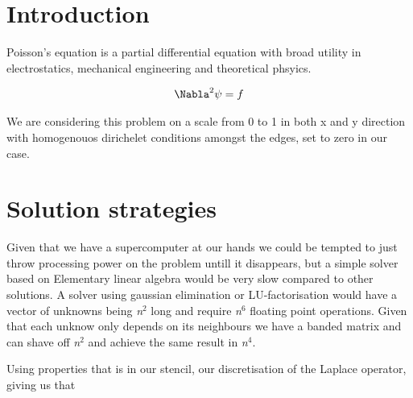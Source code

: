\section{Introduction}
Poisson's equation is a partial differential equation with broad utility in
electrostatics, mechanical engineering and theoretical phsyics.\cite{wiki}

\begin{align}
	\Nabla^2 \psi &= f \\
\end{align}

We are considering this problem on a scale from 0 to 1 in both x and y
direction with homogenouos dirichelet conditions amongst the edges, set to zero
in our case. 

\section{Solution strategies}
Given that we have a supercomputer at our hands we could be tempted to just
throw processing power on the problem untill it disappears, but a simple solver
based on Elementary linear algebra would be very slow compared to other
solutions. A solver using gaussian elimination or LU-factorisation would have a
vector of unknowns being \emph{n}$^2$ long and require \emph{n}$^6$ floating
point operations. Given that each unknow only depends on its neighbours we have
a banded matrix and can shave off \emph{n}$^2$ and achieve the same result in
\emph{n}$^4$. 

Using properties that is in our stencil, our discretisation of the Laplace
operator, giving us that 

